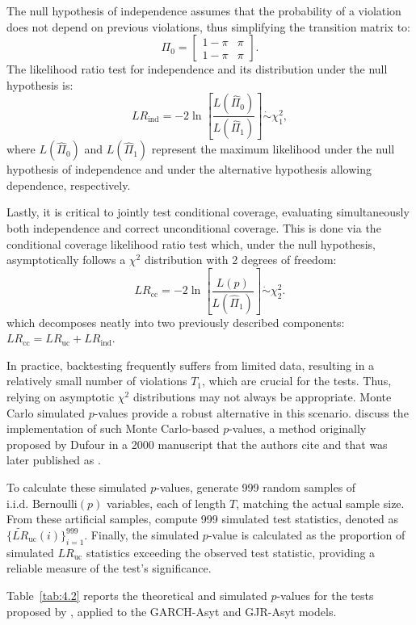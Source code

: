 The null hypothesis of independence assumes that the probability of a violation does not depend on previous violations, thus simplifying the transition matrix to:
\[
\Pi_0 =
\begin{bmatrix}
1 - \pi & \pi \\
1 - \pi & \pi
\end{bmatrix}.
\]
The likelihood ratio test for independence and its distribution under the null hypothesis is:
\[
LR_{\text{ind}} = -2 \ln \left[ \dfrac{L(\hat{\Pi}_0)}{L(\hat{\Pi}_1)} \right] \dot\sim \chi^2_1,
\]
where $L(\hat{\Pi}_0)$ and $L(\hat{\Pi}_1)$ represent the maximum likelihood under the null hypothesis of independence and under the alternative hypothesis allowing dependence, respectively.

Lastly, it is critical to jointly test conditional coverage, evaluating simultaneously both independence and correct unconditional coverage. This is done via the conditional coverage likelihood ratio test which, under the null hypothesis, asymptotically follows a $\chi^2$ distribution with 2 degrees of freedom:
\[
LR_{\text{cc}} = -2 \ln \left[ \dfrac{L(p)}{L(\hat{\Pi}_1)} \right] \dot\sim \chi^2_2.
\]
which decomposes neatly into two previously described components:  $LR_{\text{cc}}=LR_{\text{uc}}+LR_{\text{ind}}$. 

In practice, backtesting frequently suffers from limited data, resulting in a relatively small number of violations $T_1$, which are crucial for the tests. Thus, relying on asymptotic $\chi^2$ distributions may not always be appropriate. Monte Carlo simulated $p$-values provide a robust alternative in this scenario.  discuss the implementation of such Monte Carlo-based $p$-values, a method originally proposed by Dufour in a 2000 manuscript that the authors cite and that was later published as .

To calculate these simulated $p$-values, generate 999 random samples of $\text{i.i.d. Bernoulli}(p)$ variables, each of length $T$, matching the actual sample size. From these artificial samples, compute 999 simulated test statistics, denoted as $\{\widetilde{LR}_{\text{uc}}(i)\}_{i=1}^{999}$. Finally, the simulated $p$-value is calculated as the proportion of simulated $LR_{\text{uc}}$ statistics exceeding the observed test statistic, providing a reliable measure of the test’s significance.

Table~\ref{tab:4.2} reports the theoretical and simulated $p$-values for the tests proposed by , applied to the GARCH-Asyt and GJR-Asyt models.

